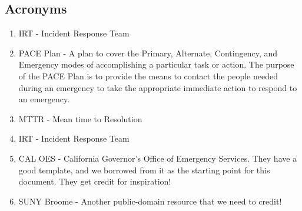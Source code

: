 \documentclass[../main.tex]{subfiles}
\begin{document}
\subsection{Acronyms}
\begin{enumerate}
    \item IRT - Incident Response Team
    \item PACE Plan - A plan to cover the Primary, Alternate, Contingency, and Emergency modes of accomplishing a particular task or action.
    The purpose of the PACE Plan is to provide the means to contact the people needed during an emergency to take the appropriate immediate action to respond to an emergency.
    \item MTTR - Mean time to Resolution
    \item IRT - Incident Response Team
    \item CAL OES - California Governor's Office of Emergency Services. They have a good template, and we borrowed from it as the starting point for this document.
    They get credit for inspiration!
    \item SUNY Broome - Another public-domain resource that we need to credit!
\end{enumerate}
\end{document}
